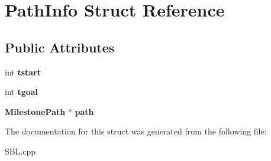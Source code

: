\section{Path\+Info Struct Reference}
\label{structPathInfo}
\subsection*{Public Attributes}
\begin{DoxyCompactItemize}
\item 
int {\bfseries tstart}\label{structPathInfo_a8079a96654eb2ef34e0e2a7cfc2ea6f6}

\item 
int {\bfseries tgoal}\label{structPathInfo_a8bb21e9023ab59f4e0f6daa9b06decb5}

\item 
{\bf Milestone\+Path} $\ast$ {\bfseries path}\label{structPathInfo_a4db317950c2af94aafe08e234570c4e3}

\end{DoxyCompactItemize}


The documentation for this struct was generated from the following file\+:\begin{DoxyCompactItemize}
\item 
S\+B\+L.\+cpp\end{DoxyCompactItemize}
